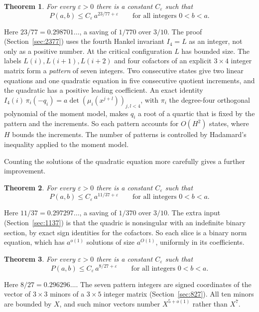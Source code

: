 \documentclass[11pt]{amsart}
\newtheorem{theorem}{Theorem}[section]
\theoremstyle{definition}
\theoremstyle{remark}
\begin{document}
\begin{theorem}\label{thm:2377}
For every $\varepsilon>0$ there is a constant $C_\varepsilon$ such that
\[
P(a,b)\le C_\varepsilon\, a^{23/77+\varepsilon}\qquad\text{for all integers }0<b<a .
\]
\end{theorem}

Here $23/77=0.298701\ldots$, a saving of $1/770$ over $3/10$. The proof (Section~\ref{sec:2377})
uses the fourth Hankel invariant $I_4=L$ as an integer, not only as a positive number. At the
critical configuration $L$ has bounded size. The labels $L(i),L(i+1),L(i+2)$ and four
cofactors of an explicit $3\times4$ integer matrix form a \emph{pattern} of seven integers. Two
consecutive states give two linear equations and one quadratic equation in five consecutive
quotient increments, and the quadratic has a positive leading coefficient. An exact identity
$I_4(i)\,\pi_i(-q_i)=a\det(\mu_i(x^{j+l}))_{j,l<4}$, with $\pi_i$ the degree-four orthogonal
polynomial of the moment model, makes $q_i$ a root of a quartic that is fixed by the pattern and
the increments. So each pattern accounts for $O(H^2)$ states, where $H$ bounds the increments.
The number of patterns is controlled by Hadamard's inequality applied to the moment model.

Counting the solutions of the quadratic equation more carefully gives a further improvement.

\begin{theorem}\label{thm:1137}
For every $\varepsilon>0$ there is a constant $C_\varepsilon$ such that
\[
P(a,b)\le C_\varepsilon\, a^{11/37+\varepsilon}\qquad\text{for all integers }0<b<a .
\]
\end{theorem}

Here $11/37=0.297297\ldots$, a saving of $1/370$ over $3/10$. The extra input
(Section~\ref{sec:1137}) is that the quadric is nonsingular with an indefinite binary section,
by exact sign identities for the cofactors. So each slice is a binary norm equation, which has
$a^{o(1)}$ solutions of size $a^{O(1)}$, uniformly in its coefficients.

\begin{theorem}\label{thm:827}
For every $\varepsilon>0$ there is a constant $C_\varepsilon$ such that
\[
P(a,b)\le C_\varepsilon\, a^{8/27+\varepsilon}\qquad\text{for all integers }0<b<a .
\]
\end{theorem}

Here $8/27=0.296296\ldots$. The seven pattern integers are signed coordinates of the vector of
$3\times3$ minors of a $3\times5$ integer matrix (Section~\ref{sec:827}). All ten minors are
bounded by $X$, and such minor vectors number $X^{5+o(1)}$ rather than $X^7$.
\end{document}
